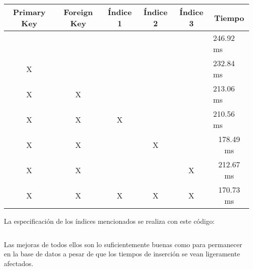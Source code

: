 \documentclass[a4paper, 11pt, oneside]{article} %
\newcommand{\scriptdir}{../scripts/} %
\begin{document}
\begin{table}[H]
\centering
\begin{tabular}{|c|c|c|l|l|l|}
\hline
Primary Key            & Foreign Key           & Índice 1              & \multicolumn{1}{c|}{Índice 2} & \multicolumn{1}{c|}{Índice 3} & \multicolumn{1}{c|}{Tiempo}    \\ \hline
\multicolumn{1}{|l|}{} & \multicolumn{1}{l|}{} & \multicolumn{1}{l|}{} &                               &                               & 246.92 ms                      \\ \hline
X                      & \multicolumn{1}{l|}{} & \multicolumn{1}{l|}{} &                               &                               & 232.84 ms                      \\ \hline
X                      & X                     & \multicolumn{1}{l|}{} &                               &                               & 213.06 ms                      \\ \hline
X                      & X                     & X                     &                               &                               & 210.56 ms                      \\ \hline
X                      & X                     &                       & \multicolumn{1}{c|}{X}        & \multicolumn{1}{c|}{}         & \multicolumn{1}{c|}{178.49 ms} \\ \hline
X                      & X                     &                       & \multicolumn{1}{c|}{}         & \multicolumn{1}{c|}{X}        & \multicolumn{1}{c|}{212.67 ms} \\ \hline
X                      & X                     & X                     & \multicolumn{1}{c|}{X}        & \multicolumn{1}{c|}{X}        & \multicolumn{1}{c|}{170.73 ms} \\ \hline
\end{tabular}
\end{table}

La especificación de los índices mencionados se realiza con este código:

\inputminted{mysql}{\scriptdir consultas/setIndices.sql}

Las mejoras de todos ellos son lo suficientemente buenas como para permanecer en la base de datos a pesar de que los tiempos de inserción se vean ligeramente afectados.

\newpage

\end{document}

